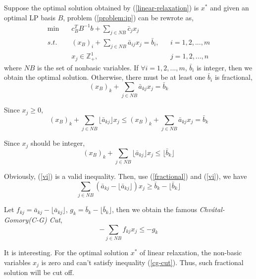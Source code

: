 \documentclass{article}
\begin{document}
Suppose the optimal solution obtained by (\ref{linear-relaxation}) is $x^*$ and given an optimal LP basis $B$, problem (\ref{problem:ip}) can be rewrote as,
\begin{align}
\min \quad & c_B^T B^{-1} b + \sum_{j \in NB} \bar{c}_jx_j \\
s.t. \quad & (x_B)_i + \sum_{j \in NB} \bar{a}_{ij}x_j = \bar{b}_i, && i = 1, 2, ..., m \\
& x_j \in \mathbb{Z}_+^1, && j = 1, 2, ..., n 
\end{align}
where $NB$ is the set of nonbasic variables. If $\forall i = 1, 2, ..., m$,  $\bar{b}_i$ is integer, then we obtain the optimal solution. Otherwise, there must be at least one $\bar{b}_i$ is fractional,
\begin{equation}
(x_B)_k + \sum_{j \in NB} \bar{a}_{kj}x_j = \bar{b}_k \label{fractional}
\end{equation}

 Since $x_j \geq 0$,
\begin{equation}
(x_B)_k + \sum_{j \in NB} \lfloor \bar{a}_{kj} \rfloor x_j \leq (x_B)_k + \sum_{j \in NB} \bar{a}_{kj}x_j  = \bar{b}_k
\end{equation}

Since $x_j$ should be integer,
\begin{equation}
(x_B)_k + \sum_{j \in NB} \lfloor \bar{a}_{kj} \rfloor x_j \leq \lfloor \bar{b}_k  \rfloor \label{vi}
\end{equation}

 Obviously, (\ref{vi}) is a valid inequality. Then, use (\ref{fractional}) and (\ref{vi}), we have
\begin{equation}
\sum_{j \in NB} (\bar{a}_{kj} - \lfloor \bar{a}_{kj} \rfloor) x_j \geq \bar{b}_k -  \lfloor \bar{b}_k  \rfloor \label{sub}
\end{equation}

Let $f_{kj} = \bar{a}_{kj} - \lfloor \bar{a}_{kj} \rfloor$, $g_k =  \bar{b}_k -  \lfloor \bar{b}_k\rfloor $, then we obtain the famous \textit{Chv\'atal-Gomory(C-G) Cut},
\begin{equation}
-\sum_{j \in NB} f_{kj} x_j \leq -g_k \label{cg-cut}
\end{equation}

 It is interesting. For the optimal solution $x^*$ of linear relaxation, the non-basic variables $x_j$ is zero and can't satisfy inequality (\ref{cg-cut}). Thus, such fractional solution will be cut off.
 
\end{document}
